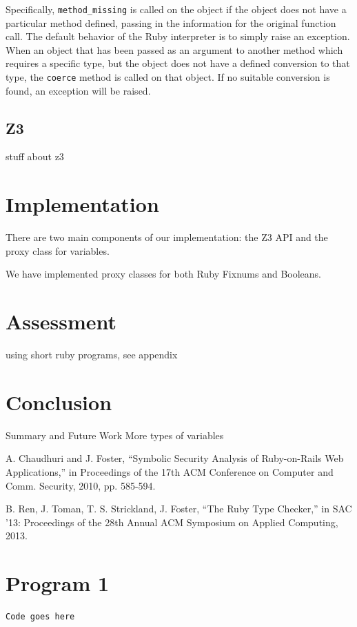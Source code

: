 \documentclass[10pt]{article}
\begin{document}
Specifically, \texttt{method\_missing} is called on the object if the object does not have a particular method defined, passing in the information for the original function call.  The default behavior of the Ruby interpreter is to simply raise an exception.\\

When an object that has been passed as an argument to another method which requires a specific type, but the object does not have a defined conversion to that type, the \texttt{coerce} method is called on that object.  If no suitable conversion is found, an exception will be raised.\\

\subsection{Z3}
stuff about z3

\section{Implementation}
There are two main components of our implementation: the Z3 API and the proxy class for variables.

We have implemented proxy classes for both Ruby Fixnums and Booleans.

\section{Assessment}
using short ruby programs, see appendix

\section{Conclusion}
Summary and Future Work
More types of variables

\begin{thebibliography}{99}
A. Chaudhuri and J. Foster, ``Symbolic Security Analysis of Ruby-on-Rails Web Applications,'' in Proceedings of the 17th ACM Conference on Computer and Comm. Security, 2010, pp. 585-594.

B. Ren, J. Toman, T. S. Strickland, J. Foster, ``The Ruby Type Checker,'' in SAC '13: Proceedings of the 28th Annual ACM Symposium on Applied Computing, 2013.

\end{thebibliography}

\appendix
\section{Program 1}
\begin{verbatim}
Code goes here
\end{verbatim}
\end{document}
